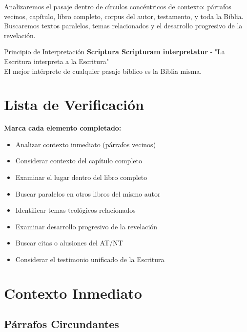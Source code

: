\documentclass[11pt,a4paper]{article}
\begin{document}
Analizaremos el pasaje dentro de círculos concéntricos de contexto: párrafos vecinos, capítulo, libro completo, corpus del autor, testamento, y toda la Biblia. Buscaremos textos paralelos, temas relacionados y el desarrollo progresivo de la revelación.

\begin{infobox}{Principio de Interpretación}
\textbf{Scriptura Scripturam interpretatur} - "La Escritura interpreta a la Escritura"\\
El mejor intérprete de cualquier pasaje bíblico es la Biblia misma.
\end{infobox}

\section{Lista de Verificación}

\begin{checklistbox}
\textbf{Marca cada elemento completado:}

\begin{itemize}[leftmargin=1cm]
    \item[$\square$] Analizar contexto inmediato (párrafos vecinos)
    \item[$\square$] Considerar contexto del capítulo completo
    \item[$\square$] Examinar el lugar dentro del libro completo
    \item[$\square$] Buscar paralelos en otros libros del mismo autor
    \item[$\square$] Identificar temas teológicos relacionados
    \item[$\square$] Examinar desarrollo progresivo de la revelación
    \item[$\square$] Buscar citas o alusiones del AT/NT
    \item[$\square$] Considerar el testimonio unificado de la Escritura
\end{itemize}
\end{checklistbox}

\newpage

\section{Contexto Inmediato}

\subsection{Párrafos Circundantes}
\end{document}

